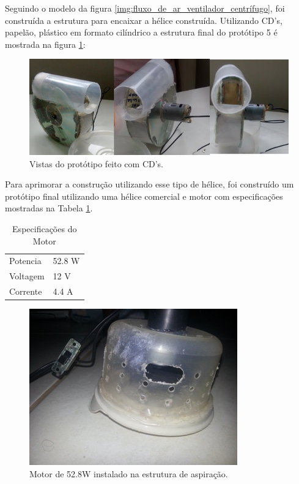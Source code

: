 		Seguindo o modelo da figura \ref{img:fluxo_de_ar_ventilador_centrífugo}, foi construída a estrutura para encaixar a hélice construída. Utilizando CD’s, papelão, plástico em formato cilíndrico a estrutura final do protótipo 5 é mostrada na figura \ref{img:protótipo_CD}: 

		\begin{figure}[H]
			\centering
			\includegraphics[scale=1]{figuras/asppc2_8.jpg}
			\caption{Vistas do protótipo feito com CD’s.}
			\label{img:protótipo_CD}
		\end{figure}

		Para aprimorar a construção utilizando esse tipo de hélice, foi construído um protótipo final utilizando uma hélice comercial e motor com especificações mostradas na Tabela \ref{tab:specsmotor}.

		\begin{table}[]
			\centering
			\caption{Especificações do Motor}
			\label{tab:specsmotor}
			\begin{tabular}{ll}
				Potencia   & 52.8 W          \\
				Voltagem   & 12 V          \\
				Corrente     & 4.4 A     
			\end{tabular}
		\end{table}

		\begin{figure}[H]
			\centering
			\includegraphics[scale=1]{figuras/asppc2_9.jpg}
			\caption{Motor de 52.8W instalado na estrutura de aspiração.}
			\label{img:estrutura_motor_52.8W}
		\end{figure}


